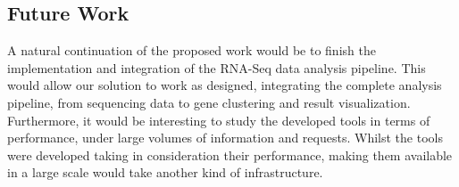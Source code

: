 \documentclass[9pt,a4paper]{extarticle}
\begin{document}
\begin{multicols}{2}
\section{Future Work}

A natural continuation of the proposed work would be to finish the
implementation and integration of the RNA-Seq data analysis pipeline. This would
allow our solution to work as designed, integrating the complete analysis
pipeline, from sequencing data to gene clustering and result visualization.
Furthermore, it would be interesting to study the developed tools in terms of
performance, under large volumes of information and requests. Whilst the tools
were developed taking in consideration their performance, making them available
in a large scale would take another kind of infrastructure.



\end{multicols}
\end{document}

